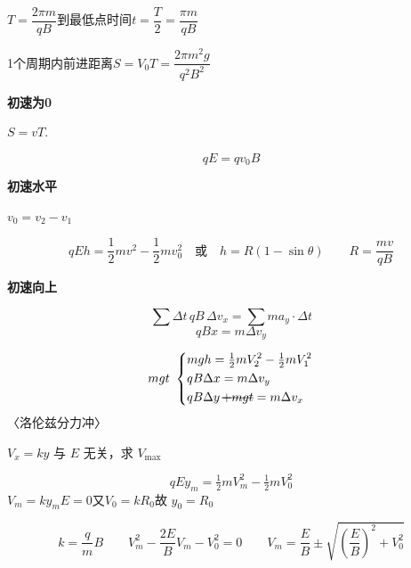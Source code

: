 $T=\dfrac{2\pi m}{qB}$\quad 到最低点时间\quad$t=\dfrac{T}{2}=\dfrac{\pi m}{qB}$

1个周期内前进距离\quad$S=V_0T=\dfrac{2\pi m^2g}{q^2B^2}$

\textbf{初速为0}


$S=vT$.

\[ qE=qv_0B \]

\textbf{初速水平}

$v_0=v_2-v_1$


\[ qEh=\frac12 mv^2-\frac12 mv_0^2 \quad\text{或}\quad h=R(1-\sin\theta)\qquad R=\frac{mv}{qB} \]

\textbf{初速向上}


\[ \sum\Delta t\,qB\,\Delta v_x=\sum m a_y\cdot\Delta t \] %
\[ qBx=m\Delta v_y \]

\[
mgt\ \left\{\begin{aligned}
&mgh=\tfrac12mV_2^2-\tfrac12mV_1^2\\
&qB\Delta x=m\Delta v_y\\
&qB\Delta y\,\text{\struck{$+mgt$}}=m\Delta v_x
\end{aligned}\right.
\]
〈洛伦兹分力冲〉 %

$V_x=ky$ 与 $E$ 无关，求 $V_{\max}$

\[ qEy_m=\tfrac12mV_m^2-\tfrac12mV_0^2 \]
$V_m=ky_m$\quad {}$E=0$\quad 又$V_0=kR_0$\quad 故 \quad $y_0=R_0$

\[ k=\frac{q}{m}B\qquad V_m^2-\frac{2E}{B}V_m-V_0^2=0\qquad V_m=\frac{E}{B}\pm\sqrt{\left(\frac{E}{B}\right)^2+V_0^2} \]

